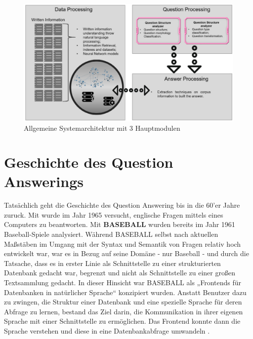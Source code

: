 \documentclass[
        ngerman,
        paper=a4,
        numbers=noendperiod,
]{scrreprt}
\begin{document}
\begin{figure}[H]
    \centering\includegraphics[width=1\linewidth]{images/arch.png}
    \caption[Allgemeine Systemarchitektur mit 3 Hauptmodulen]{Allgemeine Systemarchitektur mit 3 Hauptmodulen \cite [S. 3]{CalijorneSoares2018ASystems}}
    \label{fig:architektur}
\end{figure}
\section{Geschichte des Question Answerings}

%

Tatsächlich geht die Geschichte des Question Answering bis in die 60'er Jahre zuruck. Mit \citep{Simmons1964IndexingQuestions} wurde im Jahr 1965 versucht, englische Fragen mittels eines Computers zu beantworten. Mit \textbf{BASEBALL} \citep{Green1961Baseball:Question-answerer} wurden bereits im Jahr 1961 Baseball-Spiele analysiert. Während BASEBALL selbst nach aktuellen Maßstäben im Umgang mit der Syntax und Semantik von Fragen relativ hoch entwickelt war, war es in Bezug auf seine Domäne - nur Baseball - und durch die Tatsache, dass es in erster Linie als Schnittstelle zu einer strukturierten Datenbank gedacht war, begrenzt und nicht als Schnittstelle zu einer großen Textsammlung gedacht. In dieser Hinsicht war BASEBALL als „Frontends für Datenbanken in natürlicher Sprache“ konzipiert wurden. Anstatt Benutzer dazu zu zwingen, die Struktur einer Datenbank und eine spezielle Sprache für deren Abfrage zu lernen, bestand das Ziel darin, die Kommunikation in ihrer eigenen Sprache mit einer Schnittstelle zu ermöglichen. Das Frontend konnte dann die Sprache verstehen und diese in eine Datenbankabfrage umwandeln \citep[S. 279-280]{Hirschman2001NaturalHere}.
\end{document}

